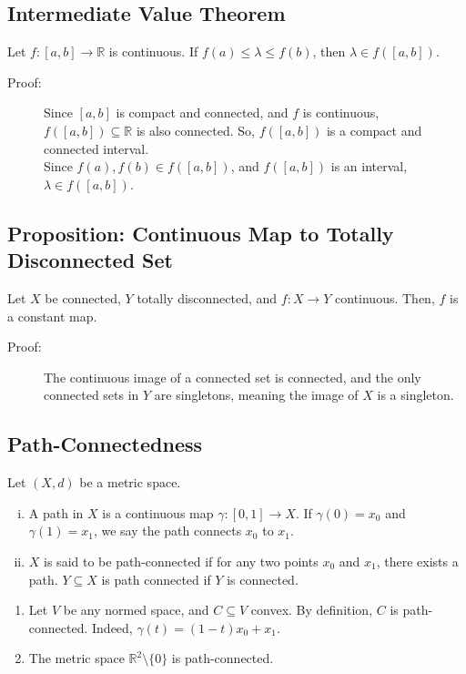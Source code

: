 \documentclass[9pt]{extarticle}
\newcommand{\R}{\mathbb{R}}
\begin{document}
  \subsection{Intermediate Value Theorem}%
  Let $f: [a,b]\rightarrow \R$ is continuous. If $f(a)\leq \lambda \leq f(b)$, then $\lambda \in f([a,b])$.
  \begin{description}
    \item[Proof:] Since $[a,b]$ is compact and connected, and $f$ is continuous, $f([a,b])\subseteq \R$ is also connected. So, $f([a,b])$ is a compact and connected interval.\\

      Since $f(a),f(b)\in f([a,b])$, and $f([a,b])$ is an interval, $\lambda \in f([a,b])$.
  \end{description}
  \subsection{Proposition: Continuous Map to Totally Disconnected Set}%
  Let $X$ be connected, $Y$ totally disconnected, and $f: X\rightarrow Y$ continuous. Then, $f$ is a constant map.
  \begin{description}
    \item[Proof:] The continuous image of a connected set is connected, and the only connected sets in $Y$ are singletons, meaning the image of $X$ is a singleton.
  \end{description}
  \subsection{Path-Connectedness}%
  Let $(X,d)$ be a metric space.
  \begin{enumerate}[(i)]
    \item A path in $X$ is a continuous map $\gamma: [0,1]\rightarrow X$. If $\gamma(0) = x_0$ and $\gamma(1) = x_1$, we say the path connects $x_0$ to $x_1$.
    \item $X$ is said to be path-connected if for any two points $x_0$ and $x_1$, there exists a path. $Y\subseteq X$ is path connected if $Y$ is connected.
  \end{enumerate}
  \begin{enumerate}[(1)]
    \item Let $V$ be any normed space, and $C\subseteq V$ convex. By definition, $C$ is path-connected. Indeed, $\gamma(t) = (1-t)x_0 + x_1$.
    \item The metric space $\R^2\setminus \{0\}$ is path-connected.
  \end{enumerate}
\end{document}
